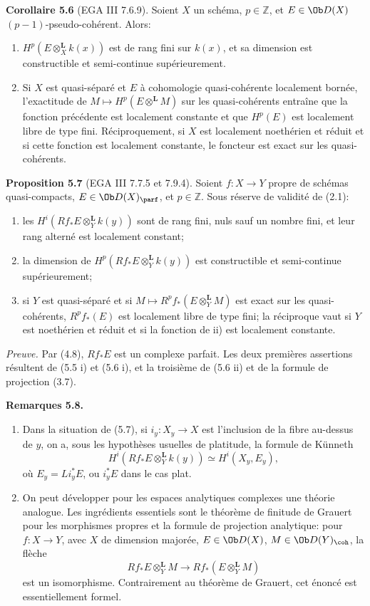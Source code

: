 \documentclass[11pt]{article}
\begin{document}
\textbf{Corollaire 5.6} (EGA III 7.6.9). Soient \(X\) un schéma, \(p\in\mathbb Z\), et \(E\in\Ob D(X)\) \((p-1)\)-pseudo-cohérent. Alors:
\begin{enumerate}[label=\roman*)]
\item \(H^p(E\otimes_X^{\mathbf L}k(x))\) est de rang fini sur \(k(x)\), et sa dimension est constructible et semi-continue supérieurement.
\item Si \(X\) est quasi-séparé et \(E\) à cohomologie quasi-cohérente localement bornée, l'exactitude de \(M\mapsto H^p(E\otimes^{\mathbf L}M)\) sur les quasi-cohérents entraîne que la fonction précédente est localement constante et que \(H^p(E)\) est localement libre de type fini. Réciproquement, si \(X\) est localement noethérien et réduit et si cette fonction est localement constante, le foncteur est exact sur les quasi-cohérents.
\end{enumerate}

\textbf{Proposition 5.7} (EGA III 7.7.5 et 7.9.4). Soient \(f:X\to Y\) propre de schémas quasi-compacts, \(E\in\Ob D(X)_{\parf}\), et \(p\in\mathbb Z\). Sous réserve de validité de (2.1):
\begin{enumerate}[label=\roman*)]
\item les \(H^i(Rf_*E\otimes_Y^{\mathbf L}k(y))\) sont de rang fini, nuls sauf un nombre fini, et leur rang alterné est localement constant;
\item la dimension de \(H^p(Rf_*E\otimes_Y^{\mathbf L}k(y))\) est constructible et semi-continue supérieurement;
\item si \(Y\) est quasi-séparé et si \(M\mapsto R^pf_*(E\otimes_Y^{\mathbf L}M)\) est exact sur les quasi-cohérents, \(R^pf_*(E)\) est localement libre de type fini; la réciproque vaut si \(Y\) est noethérien et réduit et si la fonction de ii) est localement constante.
\end{enumerate}

\emph{Preuve.} Par (4.8), \(Rf_*E\) est un complexe parfait. Les deux premières assertions résultent de (5.5 i) et (5.6 i), et la troisième de (5.6 ii) et de la formule de projection (3.7).

\textbf{Remarques 5.8.}
\begin{enumerate}[label=\alph*)]
\item Dans la situation de (5.7), si \(i_y:X_y\to X\) est l'inclusion de la fibre au-dessus de \(y\), on a, sous les hypothèses usuelles de platitude, la formule de Künneth
\[
 H^i(Rf_*E\otimes_Y^{\mathbf L}k(y))
 \simeq H^i(X_y,E_y),
\]
où \(E_y=Li_y^*E\), ou \(i_y^*E\) dans le cas plat.
\item On peut développer pour les espaces analytiques complexes une théorie analogue. Les ingrédients essentiels sont le théorème de finitude de Grauert pour les morphismes propres et la formule de projection analytique: pour \(f:X\to Y\), avec \(X\) de dimension majorée, \(E\in\Ob D(X)\), \(M\in\Ob D(Y)_{\coh}\), la flèche
\[
 Rf_*E\otimes_Y^{\mathbf L}M
 \longrightarrow
 Rf_*(E\otimes_Y^{\mathbf L}M)
\]
est un isomorphisme. Contrairement au théorème de Grauert, cet énoncé est essentiellement formel.
\end{enumerate}
\end{document}

